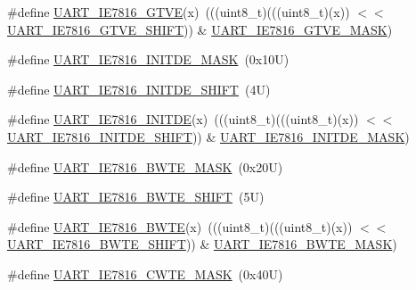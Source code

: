 \begin{DoxyCompactItemize}
\item 
\#define \mbox{\hyperlink{group___u_a_r_t___register___masks_ga3b3565dc080fe2075a27f7fab807a2e5}{U\+A\+R\+T\+\_\+\+I\+E7816\+\_\+\+G\+T\+VE}}(x)~(((uint8\+\_\+t)(((uint8\+\_\+t)(x)) $<$$<$ \mbox{\hyperlink{group___u_a_r_t___register___masks_ga92681ae737e84944e46e525a831303b9}{U\+A\+R\+T\+\_\+\+I\+E7816\+\_\+\+G\+T\+V\+E\+\_\+\+S\+H\+I\+FT}})) \& \mbox{\hyperlink{group___u_a_r_t___register___masks_ga64b8f696aa038e3a27d743e024632e7d}{U\+A\+R\+T\+\_\+\+I\+E7816\+\_\+\+G\+T\+V\+E\+\_\+\+M\+A\+SK}})
\item 
\#define \mbox{\hyperlink{group___u_a_r_t___register___masks_ga6e0fc67109bbfda4ecffbb29a7bdcac7}{U\+A\+R\+T\+\_\+\+I\+E7816\+\_\+\+I\+N\+I\+T\+D\+E\+\_\+\+M\+A\+SK}}~(0x10\+U)
\item 
\#define \mbox{\hyperlink{group___u_a_r_t___register___masks_ga92e0d4cc206532c7e058e7b0eae64492}{U\+A\+R\+T\+\_\+\+I\+E7816\+\_\+\+I\+N\+I\+T\+D\+E\+\_\+\+S\+H\+I\+FT}}~(4\+U)
\item 
\#define \mbox{\hyperlink{group___u_a_r_t___register___masks_ga37032c1701a391f5504551e0f0f8c426}{U\+A\+R\+T\+\_\+\+I\+E7816\+\_\+\+I\+N\+I\+T\+DE}}(x)~(((uint8\+\_\+t)(((uint8\+\_\+t)(x)) $<$$<$ \mbox{\hyperlink{group___u_a_r_t___register___masks_ga92e0d4cc206532c7e058e7b0eae64492}{U\+A\+R\+T\+\_\+\+I\+E7816\+\_\+\+I\+N\+I\+T\+D\+E\+\_\+\+S\+H\+I\+FT}})) \& \mbox{\hyperlink{group___u_a_r_t___register___masks_ga6e0fc67109bbfda4ecffbb29a7bdcac7}{U\+A\+R\+T\+\_\+\+I\+E7816\+\_\+\+I\+N\+I\+T\+D\+E\+\_\+\+M\+A\+SK}})
\item 
\#define \mbox{\hyperlink{group___u_a_r_t___register___masks_ga1c4d8cb11c43f38d1d2254ae85517aa0}{U\+A\+R\+T\+\_\+\+I\+E7816\+\_\+\+B\+W\+T\+E\+\_\+\+M\+A\+SK}}~(0x20\+U)
\item 
\#define \mbox{\hyperlink{group___u_a_r_t___register___masks_ga9836d1c354b24274e92d300009b0b416}{U\+A\+R\+T\+\_\+\+I\+E7816\+\_\+\+B\+W\+T\+E\+\_\+\+S\+H\+I\+FT}}~(5\+U)
\item 
\#define \mbox{\hyperlink{group___u_a_r_t___register___masks_ga3ebc6409120580e2f760c4960738f09f}{U\+A\+R\+T\+\_\+\+I\+E7816\+\_\+\+B\+W\+TE}}(x)~(((uint8\+\_\+t)(((uint8\+\_\+t)(x)) $<$$<$ \mbox{\hyperlink{group___u_a_r_t___register___masks_ga9836d1c354b24274e92d300009b0b416}{U\+A\+R\+T\+\_\+\+I\+E7816\+\_\+\+B\+W\+T\+E\+\_\+\+S\+H\+I\+FT}})) \& \mbox{\hyperlink{group___u_a_r_t___register___masks_ga1c4d8cb11c43f38d1d2254ae85517aa0}{U\+A\+R\+T\+\_\+\+I\+E7816\+\_\+\+B\+W\+T\+E\+\_\+\+M\+A\+SK}})
\item 
\#define \mbox{\hyperlink{group___u_a_r_t___register___masks_ga9722a9d0abe861759ebfce9a874790d7}{U\+A\+R\+T\+\_\+\+I\+E7816\+\_\+\+C\+W\+T\+E\+\_\+\+M\+A\+SK}}~(0x40\+U)
$$
\end{DoxyCompactItemize}
